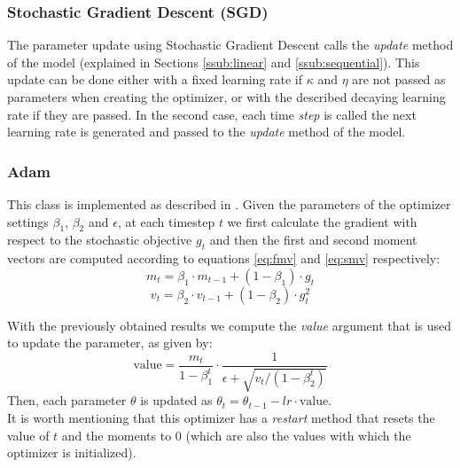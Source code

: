 \documentclass[10pt,conference,compsocconf]{IEEEtran}
\begin{document}
  	\subsubsection{Stochastic Gradient Descent (SGD)} %
  	\label{sub:stochastic_gradient_descent_}
        The parameter update using Stochastic Gradient Descent calls the \textit{update} method of the model (explained in Sections \ref{ssub:linear} and \ref{ssub:sequential}). This update can be done either with a fixed learning rate if $\kappa$ and $\eta$ are not passed as parameters when creating the optimizer, or with the described decaying learning rate if they are passed. In the second case, each time \textit{step} is called the next learning rate is generated and passed to the \textit{update} method of the model.
  	\subsubsection{Adam} %
  	\label{ssub:adam}
        This class is implemented as described in \cite{kingma2014adam}.  Given the parameters of the optimizer settings $\beta_1$, $\beta_2$ and $\epsilon$, at each timestep $t$ we first calculate the gradient with respect to the stochastic objective $g_t$ and then the first and second moment vectors are computed according to equations \ref{eq:fmv} and \ref{eq:smv} respectively:
  		\begin{equation} \label{eq:fmv}
            m_t=\beta_1\cdot m_{t-1}+(1-\beta_1)\cdot g_t
        \end{equation}
  		\begin{equation}
  		    \label{eq:smv}
            v_t=\beta_2\cdot v_{t-1}+(1-\beta_2)\cdot g_t^2
        \end{equation}

        With the previously obtained results we compute the \textit{value} argument that is used to update the parameter, as given by:
        \begin{equation}
  		    \label{eq:valueadam}
            \text{value} = \frac{m_t}{1 - \beta_1^{t}}\cdot \frac{1}{\epsilon+\sqrt{v_t/(1-\beta_2^t)}}
        \end{equation}
        Then, each parameter $\theta$ is updated as $\theta_{t}=\theta_{t-1}-lr\cdot\text{value}$.\\
        It is worth mentioning that this optimizer has a \textit{restart} method that resets the value of $t$ and the moments to $0$ (which are also the values with which the optimizer is initialized).
        
\end{document}
